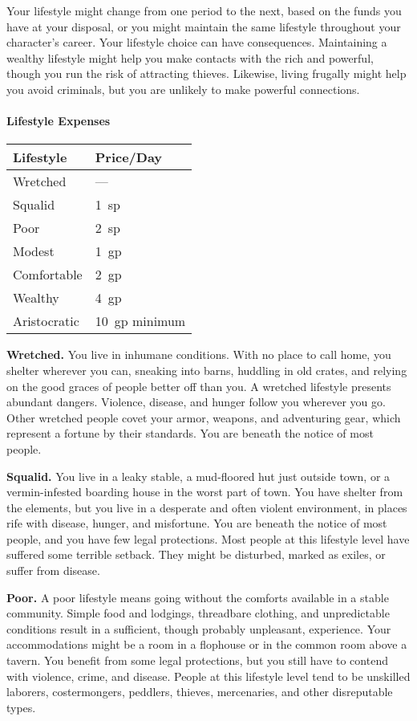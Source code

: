 \documentclass[
]{article}
\begin{document}
Your lifestyle might change from one period to the next, based on the
funds you have at your disposal, or you might maintain the same
lifestyle throughout your character's career. Your lifestyle choice can
have consequences. Maintaining a wealthy lifestyle might help you make
contacts with the rich and powerful, though you run the risk of
attracting thieves. Likewise, living frugally might help you avoid
criminals, but you are unlikely to make powerful connections.

\hypertarget{lifestyle-expenses-1}{%
\paragraph{Lifestyle Expenses}\label{lifestyle-expenses-1}}

\begin{longtable}[]{@{}ll@{}}
\toprule
Lifestyle & Price/Day\tabularnewline
\midrule
\endhead
Wretched & ---\tabularnewline
Squalid & 1~sp\tabularnewline
Poor & 2~sp\tabularnewline
Modest & 1~gp\tabularnewline
Comfortable & 2~gp\tabularnewline
Wealthy & 4~gp\tabularnewline
Aristocratic & 10~gp minimum\tabularnewline
\bottomrule
\end{longtable}

\textbf{Wretched.} You live in inhumane conditions. With no place to
call home, you shelter wherever you can, sneaking into barns, huddling
in old crates, and relying on the good graces of people better off than
you. A wretched lifestyle presents abundant dangers. Violence, disease,
and hunger follow you wherever you go. Other wretched people covet your
armor, weapons, and adventuring gear, which represent a fortune by their
standards. You are beneath the notice of most people.

\textbf{Squalid.} You live in a leaky stable, a mud-floored hut just
outside town, or a vermin-infested boarding house in the worst part of
town. You have shelter from the elements, but you live in a desperate
and often violent environment, in places rife with disease, hunger, and
misfortune. You are beneath the notice of most people, and you have few
legal protections. Most people at this lifestyle level have suffered
some terrible setback. They might be disturbed, marked as exiles, or
suffer from disease.

\textbf{Poor.} A poor lifestyle means going without the comforts
available in a stable community. Simple food and lodgings, threadbare
clothing, and unpredictable conditions result in a sufficient, though
probably unpleasant, experience. Your accommodations might be a room in
a flophouse or in the common room above a tavern. You benefit from some
legal protections, but you still have to contend with violence, crime,
and disease. People at this lifestyle level tend to be unskilled
laborers, costermongers, peddlers, thieves, mercenaries, and other
disreputable types.
\end{document}

